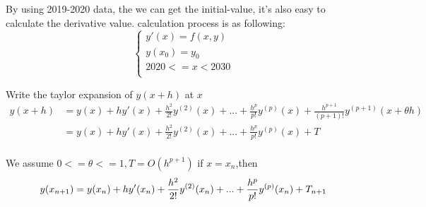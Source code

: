 \documentclass{mcmthesis}
\begin{document}
By using 2019-2020 data, the we can get the initial-value, it’s also easy to calculate the derivative value. calculation process is as following:\\

\begin{equation}
\begin{cases}
	y'(x) = f(x,y) \\
	y(x_0) = y_0\\
	2020 <= x < 2030 \\
\end{cases}
\end{equation}


Write the taylor expansion of $y(x+h)$ at $x$
\begin{equation}
	\begin{split}
		y(x+h)
		&=y(x)+hy'(x)+\frac{h^2}{2!}y^{(2)}(x)+...+ \frac{h^p}{p!}y^{(p)}(x)+\frac{h^{p+1}}{(p+1)!}y^{(p+1)}(x+\theta h)\\
		&=y(x)+hy'(x)+\frac{h^2}{2!}y^{(2)}(x)+...+ \frac{h^p}{p!}y^{(p)}(x)+T\\
	\end{split}
\end{equation}

We assume $0 <= \theta <= 1, T = O(h^{p+1})$
if $x = x_n$,then
\begin{equation}
y(x_{n+1})=y(x_n)+hy'(x_n)+\frac{h^2}{2!}y^{(2)}(x_n)+...+ \frac{h^p}{p!}y^{(p)}(x_n)+T_{n+1}\\
\end{equation}
\end{document}
